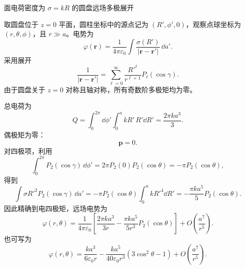 \begin{question}
面电荷密度为 $\sigma=kR$ 的圆盘远场多极展开
\begin{solution}
取圆盘位于 $z=0$ 平面，圆柱坐标中的源点记为 $(R',\phi',0)$，观察点球坐标为 $(r,\theta,\phi)$，且 $r\gg a$。电势为
\[
  \varphi(\mathbf r)=\frac{1}{4\pi\varepsilon_0}
  \int\frac{\sigma(R')}{|\mathbf r-\mathbf r'|}\,\dd a'.
\]
采用展开
\[
  \frac1{|\mathbf r-\mathbf r'|}
  =\sum_{\ell=0}^{\infty}
  \frac{R'^\ell}{r^{\ell+1}}P_\ell(\cos\gamma).
\]
由于圆盘关于 $z=0$ 对称且轴对称，所有奇数阶多极矩均为零。

总电荷为
\[
  Q=\int_0^{2\pi}\dd\phi'\int_0^a kR'\,R'\dd R'
  =\boxed{\frac{2\pi ka^3}{3}}.
\]
偶极矩为零：
\[
  \boxed{\mathbf p=0}.
\]
对四极项，利用
\[
  \int_0^{2\pi}P_2(\cos\gamma)\,\dd\phi'
  =2\pi P_2(0)P_2(\cos\theta)
  =-\pi P_2(\cos\theta),
\]
得到
\[
  \int \sigma R'^2P_2(\cos\gamma)\,\dd a'
  =-\pi P_2(\cos\theta)
  \int_0^a kR'^4\dd R'
  =-\frac{\pi ka^5}{5}P_2(\cos\theta).
\]
因此精确到电四极矩，远场电势为
\[
  \boxed{
  \varphi(r,\theta)=\frac{1}{4\pi\varepsilon_0}
  \left[
  \frac{2\pi ka^3}{3r}
  -\frac{\pi ka^5}{5r^3}P_2(\cos\theta)
  \right]
  +O\!\left(\frac{a^7}{r^5}\right)}.
\]
也可写为
\[
  \boxed{
  \varphi(r,\theta)=
  \frac{ka^3}{6\varepsilon_0r}
  -\frac{ka^5}{40\varepsilon_0r^3}
  (3\cos^2\theta-1)
  +O\!\left(\frac{a^7}{r^5}\right)}.
\]
\end{solution}
\end{question}

